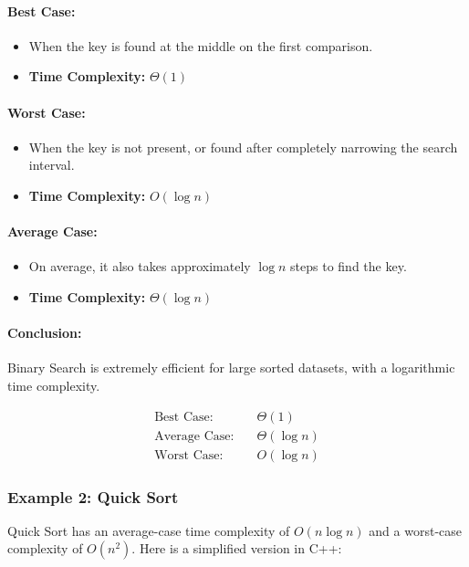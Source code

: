 \paragraph{Best Case:}
\begin{itemize}
  \item When the key is found at the middle on the first comparison.
  \item \textbf{Time Complexity:} \( \Theta(1) \)
\end{itemize}

\paragraph{Worst Case:}
\begin{itemize}
  \item When the key is not present, or found after completely narrowing the search interval.
  \item \textbf{Time Complexity:} \( O(\log n) \)
\end{itemize}

\paragraph{Average Case:}
\begin{itemize}
  \item On average, it also takes approximately \( \log n \) steps to find the key.
  \item \textbf{Time Complexity:} \( \Theta(\log n) \)
\end{itemize}

\paragraph{Conclusion:}
Binary Search is extremely efficient for large sorted datasets, with a logarithmic time complexity.

\[
\boxed{
\begin{aligned}
\text{Best Case:} & \quad \Theta(1) \\
\text{Average Case:} & \quad \Theta(\log n) \\
\text{Worst Case:} & \quad O(\log n)
\end{aligned}
}
\]

\subsubsection*{\textbf{Example 2: Quick Sort}}

Quick Sort has an average-case time complexity of \( O(n \log n) \) and a worst-case complexity of \( O(n^2) \). Here is a simplified version in C++:

